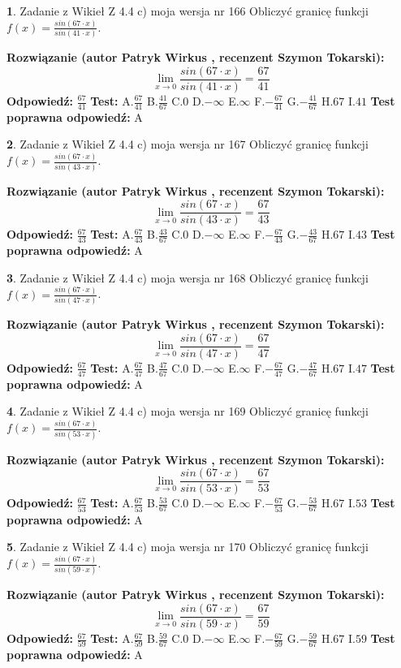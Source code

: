 \documentclass[12pt, a4paper]{article}
\theoremstyle{definition} %
\newtheorem{zad}{}
\newcommand{\zadStart}[1]{\begin{zad}#1\newline}
\newcommand{\zadStop}{\end{zad}}
\newcommand{\rozwStart}[2]{\noindent \textbf{Rozwiązanie (autor #1 , recenzent #2): }\newline}
\newcommand{\rozwStop}{\newline}
\newcommand{\odpStart}{\noindent \textbf{Odpowiedź:}\newline}
\newcommand{\odpStop}{\newline}
\newcommand{\testStart}{\noindent \textbf{Test:}\newline}
\newcommand{\testStop}{\newline}
\newcommand{\kluczStart}{\noindent \textbf{Test poprawna odpowiedź:}\newline}
\newcommand{\kluczStop}{\newline}
\begin{document}
\zadStart{Zadanie z Wikieł Z 4.4 c) moja wersja nr 166}
Obliczyć granicę funkcji $f(x)=\frac{sin(67\cdot x)}{sin(41\cdot x)}$.
\zadStop
\rozwStart{Patryk Wirkus}{Szymon Tokarski}
$$\lim\limits_{x\to 0}\frac{sin(67\cdot x)}{sin(41\cdot x)}=
\frac{67}{41}$$
\rozwStop
\odpStart
$\frac{67}{41}$
\odpStop
\testStart
A.$\frac{67}{41}$
B.$\frac{41}{67}$
C.$0$
D.$-\infty$
E.$\infty$
F.$-\frac{67}{41}$
G.$-\frac{41}{67}$
H.$67$
I.$41$
\testStop
\kluczStart
A
\kluczStop



\zadStart{Zadanie z Wikieł Z 4.4 c) moja wersja nr 167}
Obliczyć granicę funkcji $f(x)=\frac{sin(67\cdot x)}{sin(43\cdot x)}$.
\zadStop
\rozwStart{Patryk Wirkus}{Szymon Tokarski}
$$\lim\limits_{x\to 0}\frac{sin(67\cdot x)}{sin(43\cdot x)}=
\frac{67}{43}$$
\rozwStop
\odpStart
$\frac{67}{43}$
\odpStop
\testStart
A.$\frac{67}{43}$
B.$\frac{43}{67}$
C.$0$
D.$-\infty$
E.$\infty$
F.$-\frac{67}{43}$
G.$-\frac{43}{67}$
H.$67$
I.$43$
\testStop
\kluczStart
A
\kluczStop



\zadStart{Zadanie z Wikieł Z 4.4 c) moja wersja nr 168}
Obliczyć granicę funkcji $f(x)=\frac{sin(67\cdot x)}{sin(47\cdot x)}$.
\zadStop
\rozwStart{Patryk Wirkus}{Szymon Tokarski}
$$\lim\limits_{x\to 0}\frac{sin(67\cdot x)}{sin(47\cdot x)}=
\frac{67}{47}$$
\rozwStop
\odpStart
$\frac{67}{47}$
\odpStop
\testStart
A.$\frac{67}{47}$
B.$\frac{47}{67}$
C.$0$
D.$-\infty$
E.$\infty$
F.$-\frac{67}{47}$
G.$-\frac{47}{67}$
H.$67$
I.$47$
\testStop
\kluczStart
A
\kluczStop



\zadStart{Zadanie z Wikieł Z 4.4 c) moja wersja nr 169}
Obliczyć granicę funkcji $f(x)=\frac{sin(67\cdot x)}{sin(53\cdot x)}$.
\zadStop
\rozwStart{Patryk Wirkus}{Szymon Tokarski}
$$\lim\limits_{x\to 0}\frac{sin(67\cdot x)}{sin(53\cdot x)}=
\frac{67}{53}$$
\rozwStop
\odpStart
$\frac{67}{53}$
\odpStop
\testStart
A.$\frac{67}{53}$
B.$\frac{53}{67}$
C.$0$
D.$-\infty$
E.$\infty$
F.$-\frac{67}{53}$
G.$-\frac{53}{67}$
H.$67$
I.$53$
\testStop
\kluczStart
A
\kluczStop



\zadStart{Zadanie z Wikieł Z 4.4 c) moja wersja nr 170}
Obliczyć granicę funkcji $f(x)=\frac{sin(67\cdot x)}{sin(59\cdot x)}$.
\zadStop
\rozwStart{Patryk Wirkus}{Szymon Tokarski}
$$\lim\limits_{x\to 0}\frac{sin(67\cdot x)}{sin(59\cdot x)}=
\frac{67}{59}$$
\rozwStop
\odpStart
$\frac{67}{59}$
\odpStop
\testStart
A.$\frac{67}{59}$
B.$\frac{59}{67}$
C.$0$
D.$-\infty$
E.$\infty$
F.$-\frac{67}{59}$
G.$-\frac{59}{67}$
H.$67$
I.$59$
\testStop
\kluczStart
A
\kluczStop
\end{document}

